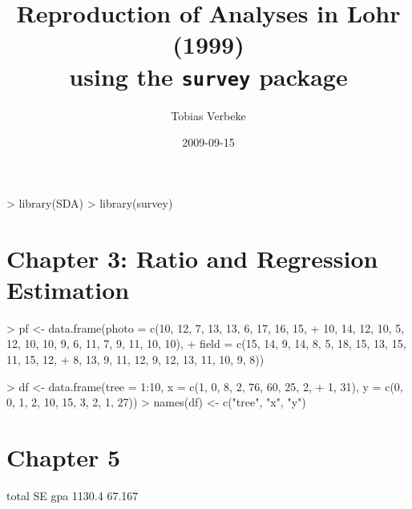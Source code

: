 \documentclass[article, 11pt, oneside]{memoir}
\begin{document}

\title{Reproduction of Analyses in Lohr (1999)\\ 
       using the \texttt{survey} package}
\author{Tobias Verbeke}
\date{2009-09-15}
\maketitle

\begin{Schunk}
\begin{Sinput}
> library(SDA)
> library(survey)
\end{Sinput}
\end{Schunk}

\chapter{Chapter 3: Ratio and Regression Estimation}

\begin{Schunk}
\begin{Sinput}
> pf <- data.frame(photo = c(10, 12, 7, 13, 13, 6, 17, 16, 15, 
+     10, 14, 12, 10, 5, 12, 10, 10, 9, 6, 11, 7, 9, 11, 10, 10), 
+     field = c(15, 14, 9, 14, 8, 5, 18, 15, 13, 15, 11, 15, 12, 
+         8, 13, 9, 11, 12, 9, 12, 13, 11, 10, 9, 8))
\end{Sinput}
\end{Schunk}

\begin{Schunk}
\begin{Sinput}
> df <- data.frame(tree = 1:10, x = c(1, 0, 8, 2, 76, 60, 25, 2, 
+     1, 31), y = c(0, 0, 1, 2, 10, 15, 3, 2, 1, 27))
> names(df) <- c("tree", "x", "y")
\end{Sinput}
\end{Schunk}


\chapter{Chapter 5}

\begin{Schunk}
\begin{Soutput}
     total     SE
gpa 1130.4 67.167
\end{Soutput}
\end{Schunk}
\end{document}

